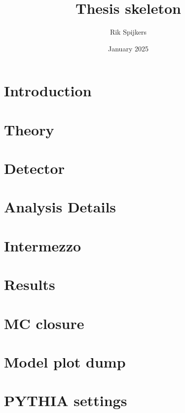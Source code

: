 \documentclass[11pt, b5paper, twoside]{book}
\title{Thesis skeleton}
\author{Rik Spijkers}
\date{January 2025}
\begin{document}
\linenumbers


% 

\chapter{Introduction}
\label{ch:introduction}


\chapter{Theory}
\label{ch:theory}


\chapter{Detector}
\label{ch:detector}


\chapter{Analysis Details}
\label{ch:methodology}


\chapter{Intermezzo}
\label{ch:intermezzo}


\chapter{Results}
\label{ch:results}


\appendix

\chapter{MC closure}
\label{ch:mc_closure}


\chapter{Model plot dump}
% 

\chapter{PYTHIA settings}
\label{ch:pythia_settings}


% 


\printbibliography
\end{document}
